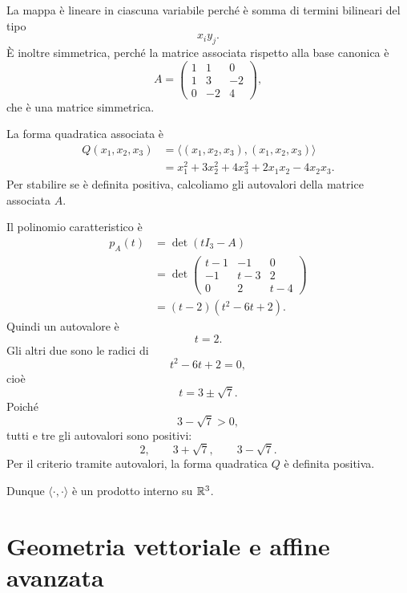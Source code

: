 \documentclass[a4paper]{article}
\begin{document}
\begin{snippetsolution}{}
    La mappa è lineare in ciascuna variabile perché è somma di termini bilineari del tipo
    \[
        x_iy_j.
    \]
    È inoltre simmetrica, perché la matrice associata rispetto alla base canonica è
    \[
        A=
        \begin{pmatrix}
            1 & 1 & 0\\
            1 & 3 & -2\\
            0 & -2 & 4
        \end{pmatrix},
    \]
    che è una matrice simmetrica.

    La forma quadratica associata è
    \begin{align*}
        Q(x_1,x_2,x_3)
        &=
        \langle (x_1,x_2,x_3),(x_1,x_2,x_3)\rangle\\
        &=
        x_1^2+3x_2^2+4x_3^2+2x_1x_2-4x_2x_3.
    \end{align*}
    Per stabilire se è definita positiva, calcoliamo gli autovalori della matrice associata \(A\).

    Il polinomio caratteristico è
    \begin{align*}
        p_A(t)
        &=
        \det(tI_3-A)\\
        &=
        \det
        \begin{pmatrix}
            t-1 & -1 & 0\\
            -1 & t-3 & 2\\
            0 & 2 & t-4
        \end{pmatrix}\\
        &=
        (t-2)(t^2-6t+2).
    \end{align*}
    Quindi un autovalore è
    \[
        t=2.
    \]
    Gli altri due sono le radici di
    \[
        t^2-6t+2=0,
    \]
    cioè
    \[
        t=3\pm\sqrt{7}.
    \]
    Poiché
    \[
        3-\sqrt{7}>0,
    \]
    tutti e tre gli autovalori sono positivi:
    \[
        2,\qquad 3+\sqrt{7},\qquad 3-\sqrt{7}.
    \]
    Per il criterio tramite autovalori, la forma quadratica \(Q\) è definita positiva.

    Dunque \(\langle\cdot,\cdot\rangle\) è un prodotto interno su \(\mathbb{R}^3\).
\end{snippetsolution}

\part{Geometria vettoriale e affine avanzata}
\end{document}
